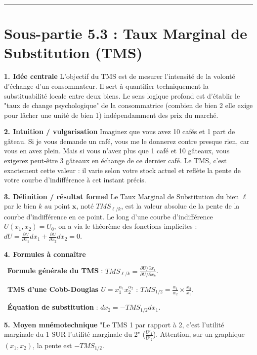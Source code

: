 \documentclass[11pt, a4paper]{report}
\begin{document}
\vspace{1cm}\hrule\vspace{1cm}

\section{Sous-partie 5.3 : Taux Marginal de Substitution (TMS)}

\textbf{1. Idée centrale}
L'objectif du TMS est de mesurer l'intensité de la volonté d'échange d'un consommateur. Il sert à quantifier techniquement la substituabilité locale entre deux biens. Le sens logique profond est d'établir le "taux de change psychologique" de la consommatrice (combien de bien 2 elle exige pour lâcher une unité de bien 1) indépendamment des prix du marché.

\textbf{2. Intuition / vulgarisation}
Imaginez que vous avez 10 cafés et 1 part de gâteau. Si je vous demande un café, vous me le donnerez contre presque rien, car vous en avez plein. Mais si vous n'avez plus que 1 café et 10 gâteaux, vous exigerez peut-être 3 gâteaux en échange de ce dernier café. Le TMS, c'est exactement cette valeur : il varie selon votre stock actuel et reflète la pente de votre courbe d'indifférence à cet instant précis.

\textbf{3. Définition / résultat formel}
Le Taux Marginal de Substitution du bien $\ell$ par le bien $k$ au point $\mathbf{x}$, noté $TMS_{\ell/k}$, est la valeur absolue de la pente de la courbe d'indifférence en ce point.
Le long d'une courbe d'indifférence $U(x_1, x_2) = U_0$, on a via le théorème des fonctions implicites :
$dU = \frac{\partial U}{\partial x_1} dx_1 + \frac{\partial U}{\partial x_2} dx_2 = 0$.

\textbf{4. Formules à connaître}
\par \textbullet\ \textbf{Formule générale du TMS} : $TMS_{\ell/k} = \frac{\partial U / \partial x_\ell}{\partial U / \partial x_k}$.
\par \textbullet\ \textbf{TMS d'une Cobb-Douglas $U = x_1^{\alpha_1} x_2^{\alpha_2}$} : $TMS_{1/2} = \frac{\alpha_1}{\alpha_2} \times \frac{x_2}{x_1}$.
\par \textbullet\ \textbf{Équation de substitution} : $dx_2 = - TMS_{1/2} dx_1$.

\textbf{5. Moyen mnémotechnique}
"Le TMS 1 par rapport à 2, c'est l'utilité marginale du 1 SUR l'utilité marginale du 2" ($\frac{U'_1}{U'_2}$). Attention, sur un graphique $(x_1, x_2)$, la pente est $-TMS_{1/2}$.
\end{document}
